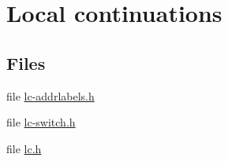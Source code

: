 \hypertarget{group__lc}{\section{Local continuations}
\label{group__lc}
}
\subsection*{Files}
\begin{DoxyCompactItemize}
\item 
file \hyperlink{lc-addrlabels_8h}{lc-\/addrlabels.\-h}
\item 
file \hyperlink{lc-switch_8h}{lc-\/switch.\-h}
\item 
file \hyperlink{lc_8h}{lc.\-h}
\end{DoxyCompactItemize}
